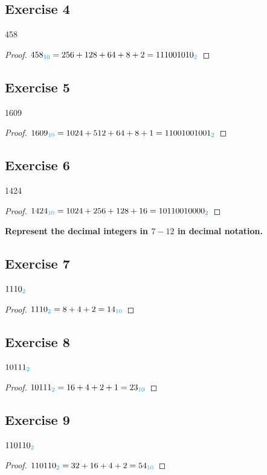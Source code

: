 \documentclass[14pt]{extarticle}
\newcommand{\base}[1]{{\color{cyan}#1}}
\begin{document}
\subsection{Exercise 4}
458

\begin{proof}
$458_\base{10} = 256 + 128 + 64 + 8 + 2 = 111001010_\base{2}$
\end{proof}

\subsection{Exercise 5}
1609

\begin{proof}
$1609_\base{10} = 1024 + 512 + 64 + 8 + 1 = 11001001001_\base{2}$
\end{proof}

\subsection{Exercise 6}
1424

\begin{proof}
$1424_\base{10} = 1024 + 256 + 128 + 16 = 10110010000_\base{2}$
\end{proof}

{\bf \color{cyan} Represent the decimal integers in $7-12$ in decimal notation.}

\subsection{Exercise 7}
$1110_\base{2}$

\begin{proof}
$1110_\base{2} = 8 + 4 + 2 = 14_\base{10}$
\end{proof}

\subsection{Exercise 8}
$10111_\base{2}$

\begin{proof}
$10111_\base{2} = 16 + 4 + 2 + 1 = 23_\base{10}$
\end{proof}

\subsection{Exercise 9}
$110110_\base{2}$

\begin{proof}
$110110_\base{2} = 32 + 16 + 4 + 2 = 54_\base{10}$
\end{proof}
\end{document}
